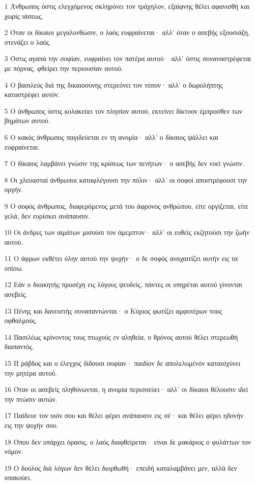 \par 1 Άνθρωπος όστις ελεγχόμενος σκληρύνει τον τράχηλον, εξαίφνης θέλει αφανισθή και χωρίς ιάσεως.
\par 2 Όταν οι δίκαιοι μεγαλυνθώσιν, ο λαός ευφραίνεται· αλλ' όταν ο ασεβής εξουσιάζη, στενάζει ο λαός.
\par 3 Όστις αγαπά την σοφίαν, ευφραίνει τον πατέρα αυτού· αλλ' όστις συναναστρέφεται με πόρνας, φθείρει την περιουσίαν αυτού.
\par 4 Ο βασιλεύς διά της δικαιοσύνης στερεόνει τον τόπον· αλλ' ο δωρολήπτης καταστρέφει αυτόν.
\par 5 Ο άνθρωπος όστις κολακεύει τον πλησίον αυτού, εκτείνει δίκτυον έμπροσθεν των βημάτων αυτού.
\par 6 Ο κακός άνθρωπος παγιδεύεται εν τη ανομία· αλλ' ο δίκαιος ψάλλει και ευφραίνεται.
\par 7 Ο δίκαιος λαμβάνει γνώσιν της κρίσεως των πενήτων· ο ασεβής δεν νοεί γνώσιν.
\par 8 Οι χλευασταί άνθρωποι καταφλέγουσι την πόλιν· αλλ' οι σοφοί αποστρέφουσι την οργήν.
\par 9 Ο σοφός άνθρωπος, διαφερόμενος μετά του άφρονος ανθρώπου, είτε οργίζεται, είτε γελά, δεν ευρίσκει ανάπαυσιν.
\par 10 Οι άνδρες των αιμάτων μισούσι τον άμεμπτον· αλλ' οι ευθείς εκζητούσι την ζωήν αυτού.
\par 11 Ο άφρων εκθέτει όλην αυτού την ψυχήν· ο δε σοφός αναχαιτίζει αυτήν εις τα οπίσω.
\par 12 Εάν ο διοικητής προσέχη εις λόγους ψευδείς, πάντες οι υπηρέται αυτού γίνονται ασεβείς.
\par 13 Πένης και δανειστής συναπαντώνται· ο Κύριος φωτίζει αμφοτέρων τους οφθαλμούς.
\par 14 Βασιλέως κρίνοντος τους πτωχούς εν αληθεία, ο θρόνος αυτού θέλει στερεωθή διαπαντός.
\par 15 Η ράβδος και ο έλεγχος δίδουσι σοφίαν· παιδίον δε απολελυμένόν καταισχύνει την μητέρα αυτού.
\par 16 Όταν οι ασεβείς πληθύνωνται, η ανομία περισσεύει· αλλ' οι δίκαιοι θέλουσιν ιδεί την πτώσιν αυτών.
\par 17 Παίδευε τον υιόν σου και θέλει φέρει ανάπαυσιν εις σέ· και θέλει φέρει ηδονήν εις την ψυχήν σου.
\par 18 Όπου δεν υπάρχει όρασις, ο λαός διαφθείρεται· είναι δε μακάριος ο φυλάττων τον νόμον.
\par 19 Ο δούλος διά λόγων δεν θέλει διορθωθή· επειδή καταλαμβάνει μεν, αλλά δεν υπακούει.
